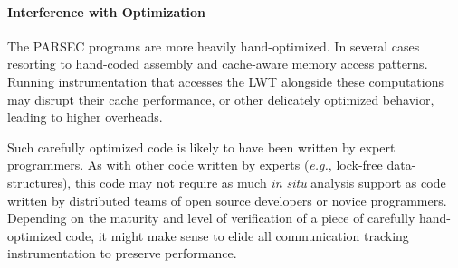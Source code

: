 \documentclass[preprint,9pt]{sigplanconf}
\newcommand{\addtodo}[1]{\textcolor{red}{[To do: #1]}}
\newcommand{\lwt}{LWT\xspace}
\begin{document}
\paragraph{Interference with Optimization}
The PARSEC programs are more heavily hand-optimized. In several cases
resorting to hand-coded assembly and cache-aware memory access patterns.
Running instrumentation that accesses the \lwt alongside these computations may
disrupt their cache performance, or other delicately optimized behavior,
leading to higher overheads.  

Such carefully optimized code is likely to have been written by expert
programmers.  As with other code written by experts ({\em e.g.}, lock-free
data-structures), this code may not require as much {\em in situ} analysis
support as code written by distributed teams of open source developers or
novice programmers.  Depending on the maturity and level of verification of a
piece of carefully hand-optimized code, it might make sense to elide all
communication tracking instrumentation to preserve performance. 
 

%
%
\end{document}
